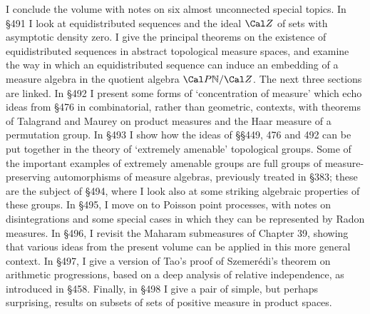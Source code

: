 
\def\chaptername{Further topics}

I conclude the volume with notes on six almost unconnected special
topics.   In \S491 I look at equidistributed sequences
and the ideal $\Cal Z$ of sets with asymptotic density zero.
I give the principal theorems on the existence of equidistributed
sequences in abstract topological measure spaces,
and examine the way in which an equidistributed sequence can induce an
embedding of a measure algebra in the quotient algebra
$\Cal P\Bbb N/\Cal Z$.
The next three sections are linked.
In \S492 I present some forms of `concentration of measure'
which echo ideas from \S476 in combinatorial, rather than geometric,
contexts, with theorems of Talagrand and
Maurey on product measures and the Haar measure of a permutation group.
In \S493 I show how the ideas
of \S\S449, 476 and 492 can be put together in the theory of
`extremely amenable' topological groups.
Some of the important examples of extremely amenable groups are full groups
of measure-preserving automorphisms of measure algebras, previously
treated in \S383;   these are the
subject of \S494, where I look also at some striking algebraic
properties of these groups.
In \S495, I move on to Poisson point processes, with notes on
disintegrations and some special cases in which they can be represented
by Radon measures.
In \S496, I revisit the Maharam submeasures of Chapter 39,
showing that various ideas from the present
volume can be applied in this more general context.
In \S497, I give a version of Tao's proof of
Szemer\'edi's theorem on arithmetic progressions, based on a deep analysis
of relative independence, as introduced in \S458.
Finally, in \S498 I give a pair of simple, but
perhaps surprising, results on subsets of
sets of positive measure in product spaces.

\discrpage

